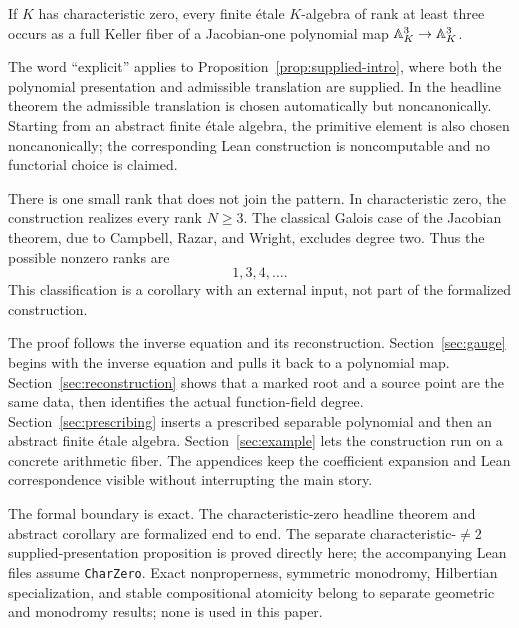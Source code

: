 \begin{corollary}\label{cor:main-intro}
If \(K\) has characteristic zero, every finite \'etale \(K\)-algebra of rank
at least three occurs as a full Keller fiber of a Jacobian-one polynomial
map \(\mathbb A^3_K\to\mathbb A^3_K\).
\end{corollary}

The word ``explicit'' applies to
Proposition~\ref{prop:supplied-intro}, where both the polynomial presentation
and admissible translation are supplied.  In the headline theorem the
admissible translation is chosen automatically but noncanonically.  Starting
from an abstract finite \'etale algebra, the primitive element is also chosen
noncanonically; the corresponding Lean construction is noncomputable and no
functorial choice is claimed.

There is one small rank that does not join the pattern.  In characteristic
zero, the construction realizes every rank \(N\geq3\).  The classical
Galois case of the Jacobian theorem, due to Campbell, Razar, and Wright,
excludes degree two.  Thus the possible nonzero ranks are
\[
 1,3,4,\ldots.
\]
This classification is a corollary with an external input, not part of the
formalized construction.

The proof follows the inverse equation and its reconstruction.
Section~\ref{sec:gauge} begins with the inverse equation and pulls it back to
a polynomial map.  Section~\ref{sec:reconstruction} shows that a marked root
and a source point are the same data, then identifies the actual
function-field degree.  Section~\ref{sec:prescribing} inserts a prescribed
separable polynomial and then an abstract finite \'etale algebra.
Section~\ref{sec:example} lets the construction run on a concrete arithmetic
fiber.  The appendices keep the coefficient expansion and Lean
correspondence visible without interrupting the main story.

The formal boundary is exact.  The characteristic-zero headline theorem and
abstract corollary are formalized end to end.  The separate
characteristic-\(\ne2\) supplied-presentation proposition is proved directly
here; the accompanying Lean files assume \texttt{CharZero}.  Exact
nonproperness, symmetric monodromy, Hilbertian specialization, and stable
compositional atomicity belong to separate geometric and monodromy results;
none is used in this paper.
